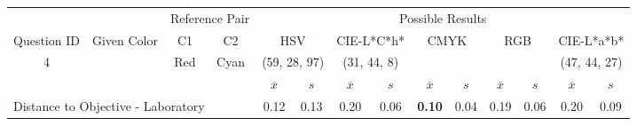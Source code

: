 \begin{table}[H]
  \resizebox{\textwidth}{!} {
  \begin{tabular}{lccccccccccccc}
    \hline
    \multicolumn{1}{c}{}                              &                                      & \multicolumn{2}{c}{Reference Pair}                   & \multicolumn{10}{c}{Possible Results}                                                                                                                                                                                                                                                                                        \\ \cline{3-14}
    \multicolumn{1}{c}{\multirow{-2}{*}{Question ID}} & \multirow{-2}{*}{Given Color}        & C1                       & C2                         & \multicolumn{2}{c}{HSV}                                        & \multicolumn{2}{c}{CIE-L*C*h*}                                 & \multicolumn{2}{c}{CMYK}                                       & \multicolumn{2}{c}{RGB}                                        & \multicolumn{2}{c}{CIE-L*a*b*}                                 \\ \hline
    \multicolumn{1}{c}{4}                             & \cellcolor[HTML]{7F00FF}{\color[HTML]{FFFFFF}(27, 12, 95)} & \multicolumn{1}{c|}{Red} & \multicolumn{1}{c|}{Cyan}  & \multicolumn{2}{c|}{\cellcolor[HTML]{FF00FF}(59, 28, 97)}      & \multicolumn{2}{c|}{\cellcolor[HTML]{91C01D}(31, 44, 8)}       & \multicolumn{2}{c|}{\cellcolor[HTML]{808080}{\color[HTML]{FFFFFF}(21, 22, 24)}}       & \multicolumn{2}{c|}{\cellcolor[HTML]{808080}{\color[HTML]{FFFFFF}(21, 22, 24)}}       & \multicolumn{2}{c|}{\cellcolor[HTML]{DDA581}(47, 44, 27)}       \\ \hline
                                                      & \multicolumn{1}{l}{}                 & \multicolumn{1}{l}{}     & \multicolumn{1}{l}{}       & \multicolumn{1}{c}{$\overline{x}$} & \multicolumn{1}{c}{$s$} & \multicolumn{1}{c}{$\overline{x}$} & \multicolumn{1}{c}{$s$} & \multicolumn{1}{c}{$\overline{x}$} & \multicolumn{1}{c}{$s$} & \multicolumn{1}{c}{$\overline{x}$} & \multicolumn{1}{c}{$s$} & \multicolumn{1}{c}{$\overline{x}$} & \multicolumn{1}{c}{$s$} \\ \hline
    \multicolumn{4}{l}{Distance to Objective - Laboratory}                                                                                           & \multicolumn{1}{|c}{0.12}       & \multicolumn{1}{c|}{0.13}    & \multicolumn{1}{|c}{0.20}       & \multicolumn{1}{c|}{0.06}    & \multicolumn{1}{|c}{\textbf{0.10}}         & \multicolumn{1}{c|}{0.04}    & \multicolumn{1}{|c}{0.19}       & \multicolumn{1}{c|}{0.06}    & \multicolumn{1}{|c}{0.20}       & \multicolumn{1}{c|}{0.09}    \\

\end{tabular}}
\end{table}
